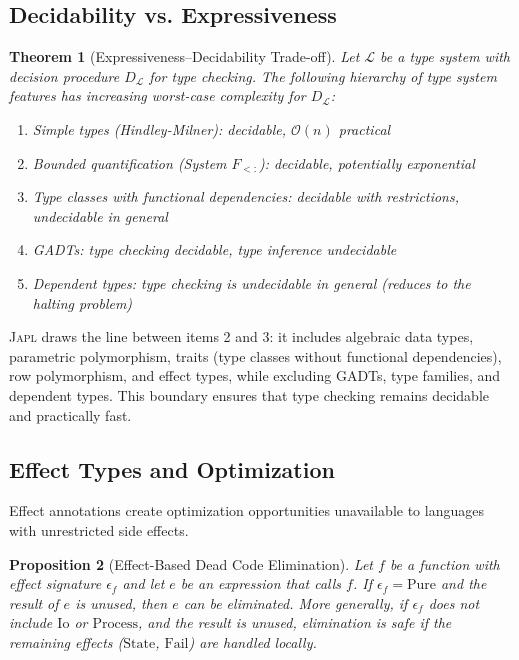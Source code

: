 \documentclass[11pt,twocolumn]{article}
\newtheorem{theorem}{Theorem}[section]
\newtheorem{proposition}[theorem]{Proposition}
\newcommand{\japl}{\textsc{Japl}}
\newcommand{\BigO}{\mathcal{O}}
\begin{document}
\subsection{Decidability vs. Expressiveness}

\begin{theorem}[Expressiveness--Decidability Trade-off]
\label{thm:expressiveness}
Let $\mathcal{L}$ be a type system with decision procedure $D_\mathcal{L}$ for type checking.
The following hierarchy of type system features has increasing worst-case complexity for $D_\mathcal{L}$:

\begin{enumerate}
\item Simple types (Hindley-Milner): decidable, $\BigO(n)$ practical
\item Bounded quantification (System $F_{<:}$): decidable, potentially exponential~\citep{pierce2002types}
\item Type classes with functional dependencies: decidable with restrictions, undecidable in general~\citep{sulzmann2007type-families}
\item GADTs: type checking decidable, type inference undecidable~\citep{jones2006gadts}
\item Dependent types: type checking is undecidable in general (reduces to the halting problem)
\end{enumerate}
\end{theorem}

\japl{} draws the line between items 2 and 3: it includes algebraic data types, parametric polymorphism, traits (type classes without functional dependencies), row polymorphism, and effect types, while excluding GADTs, type families, and dependent types.
This boundary ensures that type checking remains decidable and practically fast.

\subsection{Effect Types and Optimization}

Effect annotations create optimization opportunities unavailable to languages with unrestricted side effects.

\begin{proposition}[Effect-Based Dead Code Elimination]
Let $f$ be a function with effect signature $\epsilon_f$ and let $e$ be an expression that calls $f$.
If $\epsilon_f = \text{Pure}$ and the result of $e$ is unused, then $e$ can be eliminated.
More generally, if $\epsilon_f$ does not include $\text{Io}$ or $\text{Process}$, and the result is unused, elimination is safe if the remaining effects ($\text{State}$, $\text{Fail}$) are handled locally.
\end{proposition}
\end{document}
